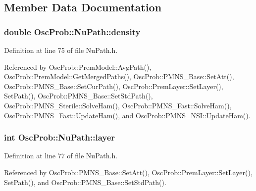 \subsection{Member Data Documentation}
\subsubsection[{\texorpdfstring{density}{density}}]{\setlength{\rightskip}{0pt plus 5cm}double Osc\+Prob\+::\+Nu\+Path\+::density}\hypertarget{structOscProb_1_1NuPath_a54ddd451db69bc54434de3cf18a117ca}{}\label{structOscProb_1_1NuPath_a54ddd451db69bc54434de3cf18a117ca}


Definition at line 75 of file Nu\+Path.\+h.



Referenced by Osc\+Prob\+::\+Prem\+Model\+::\+Avg\+Path(), Osc\+Prob\+::\+Prem\+Model\+::\+Get\+Merged\+Paths(), Osc\+Prob\+::\+P\+M\+N\+S\+\_\+\+Base\+::\+Set\+Att(), Osc\+Prob\+::\+P\+M\+N\+S\+\_\+\+Base\+::\+Set\+Cur\+Path(), Osc\+Prob\+::\+Prem\+Layer\+::\+Set\+Layer(), Set\+Path(), Osc\+Prob\+::\+P\+M\+N\+S\+\_\+\+Base\+::\+Set\+Std\+Path(), Osc\+Prob\+::\+P\+M\+N\+S\+\_\+\+Sterile\+::\+Solve\+Ham(), Osc\+Prob\+::\+P\+M\+N\+S\+\_\+\+Fast\+::\+Solve\+Ham(), Osc\+Prob\+::\+P\+M\+N\+S\+\_\+\+Fast\+::\+Update\+Ham(), and Osc\+Prob\+::\+P\+M\+N\+S\+\_\+\+N\+S\+I\+::\+Update\+Ham().

\subsubsection[{\texorpdfstring{layer}{layer}}]{\setlength{\rightskip}{0pt plus 5cm}int Osc\+Prob\+::\+Nu\+Path\+::layer}\hypertarget{structOscProb_1_1NuPath_a442b160899e554ad1d800989510d5309}{}\label{structOscProb_1_1NuPath_a442b160899e554ad1d800989510d5309}


Definition at line 77 of file Nu\+Path.\+h.



Referenced by Osc\+Prob\+::\+P\+M\+N\+S\+\_\+\+Base\+::\+Set\+Att(), Osc\+Prob\+::\+Prem\+Layer\+::\+Set\+Layer(), Set\+Path(), and Osc\+Prob\+::\+P\+M\+N\+S\+\_\+\+Base\+::\+Set\+Std\+Path().

